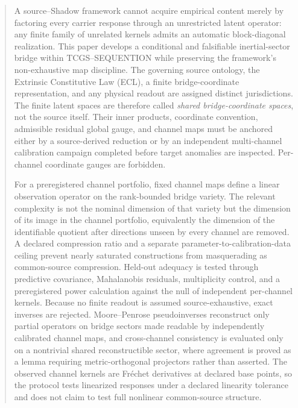 \documentclass[11pt]{article}
\begin{document}
\begin{abstract}
A source--Shadow framework cannot acquire empirical content merely by factoring every carrier response through an unrestricted latent operator: any finite family of unrelated kernels admits an automatic block-diagonal realization. This paper develops a conditional and falsifiable inertial-sector bridge within TCGS--SEQUENTION while preserving the framework's non-exhaustive map discipline. The governing source ontology, the Extrinsic Constitutive Law (ECL), a finite bridge-coordinate representation, and any physical readout are assigned distinct jurisdictions. The finite latent spaces are therefore called \emph{shared bridge-coordinate spaces}, not the source itself. Their inner products, coordinate convention, admissible residual global gauge, and channel maps must be anchored either by a source-derived reduction or by an independent multi-channel calibration campaign completed before target anomalies are inspected. Per-channel coordinate gauges are forbidden.

For a preregistered channel portfolio, fixed channel maps define a linear observation operator on the rank-bounded bridge variety. The relevant complexity is not the nominal dimension of that variety but the dimension of its image in the channel portfolio, equivalently the dimension of the identifiable quotient after directions unseen by every channel are removed. A declared compression ratio and a separate parameter-to-calibration-data ceiling prevent nearly saturated constructions from masquerading as common-source compression. Held-out adequacy is tested through predictive covariance, Mahalanobis residuals, multiplicity control, and a preregistered power calculation against the null of independent per-channel kernels. Because no finite readout is assumed source-exhaustive, exact inverses are rejected. Moore--Penrose pseudoinverses reconstruct only partial operators on bridge sectors made readable by independently calibrated channel maps, and cross-channel consistency is evaluated only on a nontrivial shared reconstructible sector, where agreement is proved as a lemma requiring metric-orthogonal projectors rather than asserted. The observed channel kernels are Fr\'echet derivatives at declared base points, so the protocol tests linearized responses under a declared linearity tolerance and does not claim to test full nonlinear common-source structure.


\end{abstract}
\end{document}
